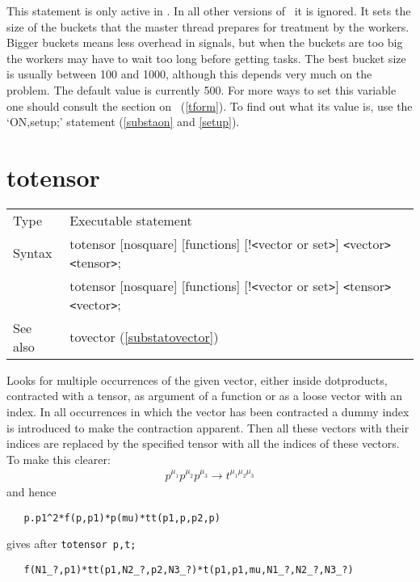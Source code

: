 \noindent This statement is only active in 
\TFORM{}. In all other versions of \FORM\ it is ignored. It sets 
the size of the buckets that the master thread 
prepares for treatment by the workers. Bigger buckets means less overhead 
in signals, but when the buckets are too big the workers may have to wait 
too long before getting tasks. The best bucket size is usually between 100 
and 1000, although this depends very much on the problem. The default value 
is currently 500. For more ways to set this variable one should consult the 
section on \TFORM\ (\ref{tform}). To find out what its value is, use the
`ON,setup;' statement (\ref{substaon} and \ref{setup}). \vspace{10mm}


\section{totensor}
\label{substatotensor}

\noindent \begin{tabular}{ll}
Type & Executable statement\\
Syntax & totensor [nosquare] [functions] [!{\tt<}vector or set{\tt>}] {\tt<}vector{\tt>} {\tt<}tensor{\tt>}; \\
       & totensor [nosquare] [functions] [!{\tt<}vector or set{\tt>}] {\tt<}tensor{\tt>} {\tt<}vector{\tt>};
\\ See also & tovector (\ref{substatovector})
\end{tabular} \vspace{4mm}

\noindent Looks for multiple occurrences of the given 
vector, either inside dotproducts, contracted with a tensor, as argument of 
a function or as a loose vector with an index. In all occurrences in 
which the vector has been contracted a dummy index is introduced to make 
the contraction apparent. Then all these vectors with their indices are 
replaced by the specified tensor with all the indices of these vectors. To 
make this clearer:
\begin{eqnarray}
    p^{\mu_1}p^{\mu_2}p^{\mu_3} \rightarrow t^{\mu_1\mu_2\mu_3} \nonumber
\end{eqnarray}
and hence
\begin{verbatim}
   p.p1^2*f(p,p1)*p(mu)*tt(p1,p,p2,p)
\end{verbatim}
gives after \verb:totensor p,t;:
\begin{verbatim}
   f(N1_?,p1)*tt(p1,N2_?,p2,N3_?)*t(p1,p1,mu,N1_?,N2_?,N3_?)
\end{verbatim}\vspace{4mm}

